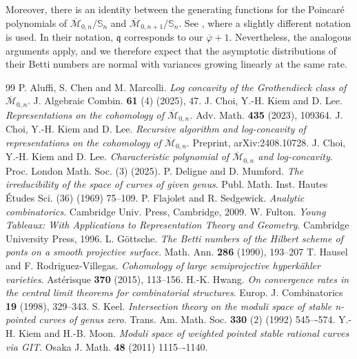 \documentclass[11pt,letterpaper]{amsart}
\numberwithin{equation}{section}
\theoremstyle{definition}
\newcommand{\cal}{\mathcal}
\def\cM{{\cal M}}
\def\Mbar{\overline{\cM}}
\def\mzn{\overline{\cM}_{0,n} }
\def\mzno{\overline{\cM}_{0,n+1} }
\def\symS{\mathbb{S}}
\begin{document}
Moreover, there is an identity between the generating functions for the Poincar\'{e} polynomials of $\mzn/\symS_n$ and $\mzno/\symS_n$. See \cite[Theorem 5.11]{CKL2}, where a slightly different notation is used. In their notation, $\mathfrak{q}$ corresponds to our $\overline{\varphi}+1$. Nevertheless, the analogous arguments apply, and we therefore expect that the asymptotic distributions of their Betti numbers are normal with variances growing linearly at the same rate.




\begin{thebibliography}{99}
	 P. Aluffi, S. Chen and M. Marcolli. {\em Log concavity of the Grothendieck class of $\overline{\mathcal{M}}_{0,n}$}. J. Algebraic Combin. \textbf{61} (4) (2025), 47.
     J. Choi, Y.-H. Kiem and D. Lee. {\em Representations on the cohomology of $\overline{\mathcal{M}}_{0,n}$.} Adv. Math. \textbf{435} (2023), 109364.
     J. Choi, Y.-H. Kiem and D. Lee. {\em Recursive algorithm and log-concavity of representations on the cohomology of $\Mbar_{0,n}$}. Preprint, arXiv:2408.10728.
     J. Choi, Y.-H. Kiem and D. Lee. {\em Characteristic polynomial of $\Mbar_{0,n}$ and log-concavity}. Proc. London Math. Soc. (3) (2025).
     P. Deligne and D. Mumford. {\em The irreducibility of the space of curves of given genus}. Publ. Math. Inst. Hautes Études Sci. (36) (1969) 75–109.
     P. Flajolet and R. Sedgewick. {\em Analytic combinatorics}. Cambridge Univ. Press, Cambridge, 2009.
     W. Fulton. {\em Young Tableaux: With Applications to Representation Theory and Geometry}. Cambridge University Press, 1996.
     L. G\"{o}ttsche. {\em The Betti numbers of the Hilbert scheme of ponts on a smooth projective surface}. Math. Ann. \textbf{286} (1990), 193--207
     T. Hausel and F. Rodriguez-Villegas. {\em Cohomology of large semiprojective hyperk\"{a}hler varieties}. Ast\'{e}risque \textbf{370} (2015), 113--156.
     H.-K. Hwang. {\em On convergence rates in the central limit theorems for combinatorial structures}. Europ. J. Combinatorics \textbf{19} (1998), 329--343.
     S. Keel. {\em Intersection theory on the moduli space of stable n-pointed curves of genus zero}. Trans. Am. Math. Soc. \textbf{330} (2) (1992) 545–-574.
     Y.-H. Kiem and H.-B. Moon. {\em Moduli space of weighted pointed stable rational curves via GIT}. Osaka J. Math. \textbf{48} (2011) 1115–-1140.

\end{thebibliography}
\end{document}
